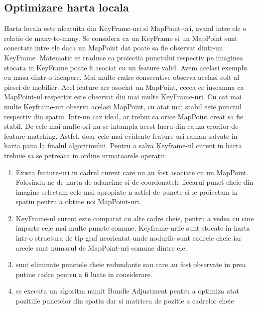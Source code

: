 \documentclass[12pt,a4paper]{report}
\begin{document}
\subsection{Optimizare harta locala}
Harta locala este alcatuita din KeyFrame-uri si MapPoint-uri, avand intre ele o relatie de many-to-many.
Se considera ca un KeyFrame si un MapPoint sunt conectate intre ele daca un MapPoint dat poate sa 
fie observat dintr-un KeyFrame. Matematic se traduce ca proiectia punctului respectiv pe imaginea
stocata in KeyFrame poate fi asociat cu un feature valid. Avem acelasi exemplu cu masa dintr-o incapere. 
Mai multe cadre consecutive observa acelasi colt al piesei de mobilier. Acel feature are
asociat un MapPoint, ceeea ce inseamna ca MapPoint-ul respectiv este observat din mai multe 
KeyFrame-uri. Cu cat mai multe Keyframe-uri observa acelasi MapPoint, cu atat mai stabil este 
punctul respectiv din spatiu. Intr-un caz ideal, ar trebui ca orice MapPoint creat sa fie 
stabil. De cele mai multe ori nu se intampla acest lucru din cauza erorilor de feature matching.
Astfel, doar cele mai evidente feature-uri raman salvate in harta pana la finalul algoritmului.
Pentru a salva Keyframe-ul curent in harta trebuie sa se petreaca in ordine urmatoarele operatii:
\begin{enumerate}
    \item Exista feature-uri in cadrul curent care nu au fost asociate cu un MapPoint.
    Folosindu-ne de harta de adancime si de coordonatele fiecarui punct cheie din imagine selectam 
    cele mai apropiate n astfel de puncte si le proiectam in spatiu pentru a obtine noi MapPoint-uri.      
    \item KeyFrame-ul curent este comparat cu alte cadre cheie, pentru a vedea cu cine imparte 
    cele mai multe puncte comune. Keyframe-urile sunt stocate in harta intr-o structura de tip 
    graf neorientat unde nodurile sunt cadrele cheie iar arcele sunt numarul de MapPoint-uri comune 
    dintre ele.
    \item sunt eliminate punctele cheie redundante sau care au fost observate in prea putine 
    cadre pentru a fi luate in considerare.
    \item se executa un algoritm numit Bundle Adjustment pentru a optimiza atat 
    pozitiile punctelor din spatiu dar si matricea de pozitie a cadrelor cheie
\end{enumerate} 
 
\end{document}
